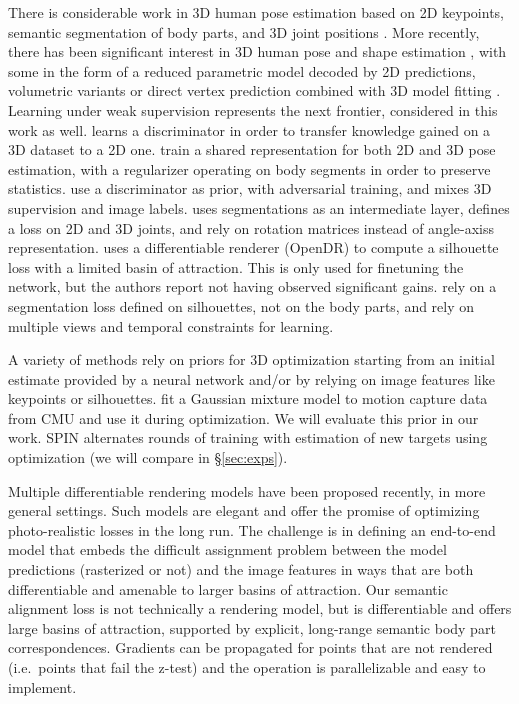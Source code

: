 \documentclass[runningheads]{llncs}
\newcommand{\ie}{i.e.\ }
\begin{document}
 There is considerable work in 3D human pose estimation based on 2D keypoints, semantic segmentation of body parts, and 3D joint positions \cite{rogez2016mocap,Fua17,mehta2017vnect,dmhs_cvpr17,martinez17iccv,iskakov2019learnable}. More recently, there has been significant interest in 3D human pose and shape estimation \cite{sun2019human,doersch2019sim2real,kanazawa2019learning,kolotouros2019convolutional,arnab2019exploiting,xu2019denserac}, with some in the form of a reduced parametric model \cite{pavlakos2017cvpr} decoded by 2D predictions, volumetric variants \cite{varol18_bodynet} or direct vertex prediction combined with 3D model fitting \cite{jackson20183d,zanfir2018monocular}. Learning under weak supervision represents the next frontier, considered in this work as well. \cite{yang20183d} learns a discriminator in order to transfer knowledge gained on a 3D dataset to a 2D one. \cite{zhou2017towards} train a shared representation for both 2D and 3D pose estimation, with a regularizer operating on body segments in order to preserve statistics.
\cite{Kanazawa2018} use a discriminator as prior, with adversarial training, and mixes 3D supervision and image labels. \cite{omran2018nbf} uses segmentations as an intermediate layer, defines a loss on 2D and 3D joints, and rely on rotation matrices instead of angle-axiss representation. 
\cite{pavlakos2018learning} uses a differentiable renderer (OpenDR) to compute a silhouette loss with a limited basin of attraction. This is only used for finetuning the network, but the authors report not having observed significant gains. \cite{NIPS2017_7108} rely on a segmentation loss defined on silhouettes, not on the body parts, and rely on multiple views and temporal constraints for learning. 

A variety of methods rely on priors for 3D optimization starting from an initial estimate provided by a neural network and/or by relying on image features like keypoints or silhouettes.
\cite{bogo2016} fit a Gaussian mixture model to motion capture data from CMU \cite{cmu2018} and use it during optimization. We will evaluate this prior in our work. SPIN\cite{kolotouros2019learning} alternates rounds of training with estimation of new targets using optimization (we will compare in \S\ref{sec:exps}).

Multiple differentiable rendering models \cite{kato2018neural,loper2014opendr,rhodin2015versatile} have been proposed recently, in more general settings. Such models are elegant and offer the promise of optimizing photo-realistic losses in the long run. The challenge is in defining an end-to-end model that embeds the difficult assignment problem between the model predictions (rasterized or not) and the image features in ways that are both differentiable and amenable to larger basins of attraction. Our semantic alignment loss is not technically a rendering model, but is differentiable and offers large basins of attraction, supported by explicit, long-range semantic body part correspondences. Gradients can be propagated for points that are not rendered (\ie points that fail the z-test) and the operation is parallelizable and easy to implement.
\end{document}
